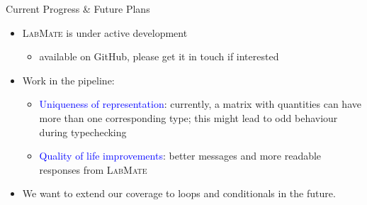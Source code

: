\documentclass[]{beamer}
\newcommand{\keyword}[1]{\textcolor{blue}{#1}}
\newcommand{\lm}{\textsc{LabMate}\xspace}
\begin{document}
\begin{frame}{Current Progress \& Future Plans}
  \begin{itemize}[<+->]
  \item \lm is under active development
    \begin{itemize}
    \item available on GitHub, please get it in touch if interested
    \end{itemize}
  \item Work in the pipeline:
    \begin{itemize}
    \item \keyword{Uniqueness of representation}: currently, a matrix with quantities can have more than one corresponding type; this might lead to odd behaviour during typechecking
      \item \keyword{Quality of life improvements}: better messages and more readable responses from \lm
      \end{itemize}
  \item We want to extend our coverage to loops and conditionals in the future.
  \end{itemize}
  \pause
\end{frame}
\end{document}
